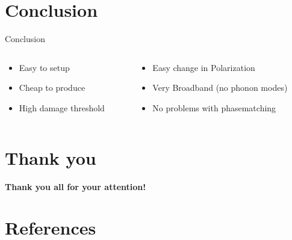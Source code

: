 \documentclass[aspectratio=1610, 9pt]{beamer}
\begin{document}
\section*{Conclusion}
\begin{frame}{Conclusion}
\begin{columns}
\begin{column}{0.5\textwidth}
  \begin{center}
  \begin{itemize}
    \item Easy to setup
    \vspace{0.2in}
    \item Cheap to produce
    \vspace{0.2in}
    \item High damage threshold
  \end{itemize}
\end{center}
\end{column}
\begin{column}{.5\textwidth}
  \begin{center}
  \begin{itemize}
    \item Easy change in Polarization
    \vspace{0.2in}
    \item Very Broadband (no phonon modes)
    \vspace{0.2in}
    \item No problems with phasematching
  \end{itemize}
\end{center}
\end{column}
\end{columns}
\end{frame}

\section*{Thank you}
\begin{frame}{}
  \begin{center}
  \textbf{\textcolor{tugreen}{Thank you all for your attention!}}
  \end{center}
\end{frame}

\section{References }
\printbibliography
\end{document}
